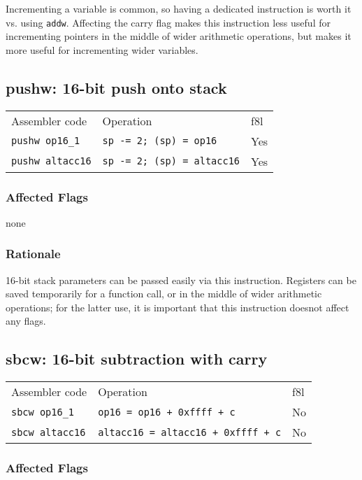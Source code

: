 \documentclass{book}
\begin{document}
Incrementing a variable is common, so having a dedicated instruction is worth it vs. using \texttt{addw}. Affecting the carry flag makes this instruction less useful for incrementing pointers in the middle of wider arithmetic operations, but makes it more useful for incrementing wider variables.


\subsection{pushw: 16-bit push onto stack}

\begin{tabular}{l l l}
Assembler code          & Operation                         & f8l \\
\texttt{pushw op16\_1}  & \texttt{sp -= 2; (sp) = op16}     & Yes \\
\texttt{pushw altacc16} & \texttt{sp -= 2; (sp) = altacc16} & Yes
\end{tabular}

\subsubsection*{Affected Flags}

none

\subsubsection*{Rationale}

16-bit stack parameters can be passed easily via this instruction. Registers can be saved temporarily for a function call, or in the middle of wider arithmetic operations; for the latter use, it is important that this instruction doesnot affect any flags.


\subsection{sbcw: 16-bit subtraction with carry}

\begin{tabular}{l l l}
Assembler code         & Operation                                 & f8l \\
\texttt{sbcw op16\_1}  & \texttt{op16 = op16 + 0xffff + c}         & No \\
\texttt{sbcw altacc16} & \texttt{altacc16 = altacc16 + 0xffff + c} & No
\end{tabular}

\subsubsection*{Affected Flags}
\end{document}
